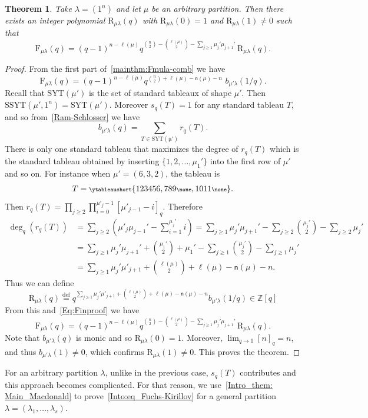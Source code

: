 \documentclass[12pt,a4paper,reqno]{amsart}
\theoremstyle{plain}
\newtheorem{theorem}{Theorem}[section]
\theoremstyle{definition}
\newcommand{\defin}{\overset{\mathrm{def}}{=}}
\newcommand{\ssyt}{\mathrm{SSYT}}
\newcommand{\1}{\mathds{1}}
\newcommand{\F}{\mathrm{F}}
\newcommand{\R}{\mathrm{R}}
\newcommand{\fn}{\mathsf{n}}
\begin{document}
\begin{theorem}\label{Fuchs_Kirillov} Take $\lambda=(1^n)$ and let $\mu$ be an arbitrary partition. Then there exists an integer polynomial $\R_{\mu\lambda}(q)$ with $\R_{\mu\lambda}(0)=1$ and $\R_{\mu\lambda}(1)\neq 0$ such that 
$$
\F_{\mu\lambda}(q)=(q-1)^{n-\ell(\mu)}q^{\binom{n}{2}-\binom{\ell(\mu)}{2}-\sum_{j\geq 1}\mu_j'\mu_{j+1}'}\, \R_{\mu\lambda}(q).
$$
\end{theorem}
\begin{proof} From the first part of~\cref{mainthm:Fmula-comb} we have
\begin{equation}\label{Eq:Finproof}
\F_{\mu\lambda}(q)=(q-1)^{n-\ell(\mu)}q^{\binom{n}{2}+\ell(\mu)-\fn(\mu)-n}\,\, b_{\mu'\lambda}(1/q). 
\end{equation}
Recall that $\mathrm{SYT}(\mu')$ is the set of standard tableaux of shape $\mu'$. Then $\ssyt(\mu',1^n)=\mathrm{SYT}(\mu')$. Moreover $s_q(T)=1$ for any standard tableau $T$, and so from~\cref{Ram-Schlosser} we have 
$$b_{\mu'\lambda}(q)=\sum_{T\in\mathrm{SYT(\mu')}}r_q(T).$$
There is only one standard tableau that maximizes the degree of $r_q(T)$ which is the standard tableau obtained by inserting $\{1,2,\dots,\mu_1'\}$ into the first row of $\mu'$ and so on. For instance when $\mu'=(6,3,2)$, the tableau is 
  \begin{align*}\scriptsize
   T=\ytableaushort{123456,789\none,{10}{11} \none}.
  \end{align*}
Then
$
r_q(T)=\prod_{j\geq 2}\prod_{i=0}^{\mu'_j-1}[\mu'_{j-1}-i]_q.
$
Therefore
\begin{equation*}
\begin{split}
\deg_q(r_q(T))&=\sum_{j\geq 2} \left(\mu'_j\mu_{j-1}'-\sum_{i=1}^{\mu_j'}i\right)=\sum_{j\geq 1}\mu_j'\mu_{j+1}'-\sum_{j\geq 2}\binom{\mu_j'}{2}-\sum_{j\geq 2}\mu_j'\\
&=\sum_{j\geq 1}\mu_j'\mu_{j+1}'+\binom{\mu_1'}{2}+\mu_1'-\sum_{j\geq 1}\binom{\mu_j'}{2}-\sum_{j\geq 1}\mu_j'\\
&=\sum_{j\geq 1}\mu_j'\mu'_{j+1}+\binom{\ell(\mu)}{2}+\ell(\mu)-\fn(\mu)-n.
\end{split}
\end{equation*} 
Thus we can define
$$
\R_{\mu\lambda}(q)\defin
q^{\sum_{j\geq 1}\mu_j'\mu'_{j+1}+\binom{\ell(\mu)}{2}+\ell(\mu)-\fn(\mu)-n}b_{\mu'\lambda}(1/q)\in \mathbb{Z}[q]
$$
From this and~\cref{Eq:Finproof} we have 
$$
\F_{\mu\lambda}(q)=(q-1)^{n-\ell(\mu)}q^{\binom{n}{2}-\binom{\ell(\mu)}{2}-\sum_{j\geq 1}\mu_j'\mu_{j+1}'}\, \R_{\mu\lambda}(q).$$
Note that $b_{\mu'\lambda}(q)$ is monic and so $\R_{\mu\lambda}(0) = 1$. Moreover, $\lim_{q \to 1} [n]_q = n$, and thus $b_{\mu'\lambda}(1) \neq 0$, which confirms $\R_{\mu\lambda}(1) \neq 0$.
This proves the theorem. 
\end{proof}
For an arbitrary partition $\lambda$, unlike in the previous case, $s_q(T)$ contributes and this approach becomes complicated. For that reason, we use~\cref{Intro_them: Main_Macdonald} to prove~\cref{Into:eq_Fuchs-Kirillov} for a general partition $\lambda=(\lambda_1,\dots,\lambda_s)$. 
\end{document}
